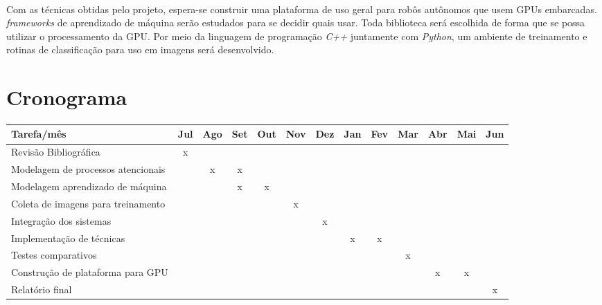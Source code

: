\documentclass[8pt]{article}
\newcommand{\tit}[1]{\textit{#1}}
\begin{document}
\begin{multicols}{2}
\paragraph{}
Com as técnicas obtidas pelo projeto, espera-se construir uma plataforma
de uso geral para robôs autônomos que usem GPUs embarcadas.
\tit{frameworks} de aprendizado de máquina serão estudados para se decidir
quais usar. 
Toda biblioteca será escolhida de forma que se possa utilizar o processamento
da GPU.
Por meio da linguagem de programação \tit{C++} juntamente com \tit{Python},  
um ambiente de treinamento e rotinas de classificação para uso em imagens
será desenvolvido.

\end{multicols}

\section{Cronograma}
\paragraph{}
\begin{table}[H]
\centering
\setlength{\tabcolsep}{.16667em}
\begin{tabular}{|C{5cm}|c|c|c|c|c|c|c|c|c|c|c|c|}
	\hline
	Tarefa/mês & Jul & Ago & Set & Out & Nov & Dez & Jan & Fev & Mar & Abr & Mai & 
	Jun \\
	\hline
	Revisão Bibliográfica & x & & & & & & & & & & & \\
	\hline
	Modelagem de processos atencionais & & x & x & & & & & & & & & \\
	\hline
	Modelagem aprendizado de máquina & & & x & x & & & & & & & & \\
	\hline
	Coleta de imagens para treinamento & & & & & x & & & & & & & \\
	\hline
	Integração dos sistemas & & & & & & x & & & & & & \\
	\hline
	Implementação de técnicas & & & & & & & x & x & & & & \\
	\hline
	Testes comparativos & & & & & & &  & & x & & & \\
	\hline
	Construção de plataforma para GPU & & & & & & & & & & x & x & \\
	\hline
	Relatório final & & & & & & & & & & & & x \\
	\hline
\end{tabular}
\end{table}

\printbibliography
\end{document}
